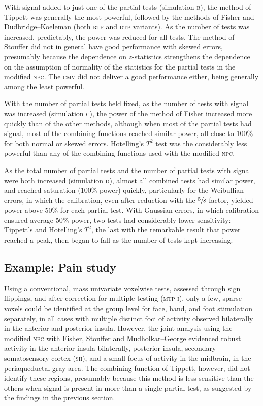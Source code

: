 With signal added to just one of the partial tests (simulation \textsc{b}), the method of Tippett was generally the most powerful, followed by the methods of Fisher and Dudbridge--Koeleman (both \textsc{rtp} and \textsc{dtp} variants). As the number of tests was increased, predictably, the power was reduced for all tests. The method of Stouffer did not in general have good performance with skewed errors, presumably because the dependence on $z$-statistics strengthens the dependence on the assumption of normality of the statistics for the partial tests in the modified \textsc{npc}. The \textsc{cmv} did not deliver a good performance either, being generally among the least powerful.

With the number of partial tests held fixed, as the number of tests with signal was increased (simulation \textsc{c}), the power of the method of Fisher increased more quickly than of the other methods, although when most of the partial tests had signal, most of the combining functions reached similar power, all close to 100\% for both normal or skewed errors. Hotelling's $T^2$ test was the considerably less powerful than any of the combining functions used with the modified \textsc{npc}.

As the total number of partial tests and the number of partial tests with signal were both increased (simulation \textsc{d}), almost all combined tests had similar power, and reached saturation (100\% power) quickly, particularly for the Weibullian errors, in which the calibration, even after reduction with the $\sfrac{5}{8}$ factor, yielded power above 50\% for each partial test. With Gaussian errors, in which calibration ensured average 50\% power, two tests had considerably lower sensitivity: Tippett's and Hotelling's $T^2$, the last with the remarkable result that power reached a peak, then began to fall as the number of tests kept increasing.

\subsection{Example: Pain study}

Using a conventional, mass univariate voxelwise tests, assessed through sign flippings, and after correction for multiple testing (\textsc{mtp-i}), only a few, sparse voxels could be identified at the group level for face, hand, and foot stimulation separately, in all cases with multiple distinct foci of activity observed bilaterally in the anterior and posterior insula. However, the joint analysis using the modified \textsc{npc} with Fisher, Stouffer and Mudholkar--George evidenced robust activity in the anterior insula bilaterally, posterior insula, secondary somatosensory cortex (\textsc{sii}), and a small focus of activity in the midbrain, in the periaqueductal gray area. The combining function of Tippett, however, did not identify these regions, presumably because this method is less sensitive than the others when signal is present in more than a single partial test, as suggested by the findings in the previous section.


